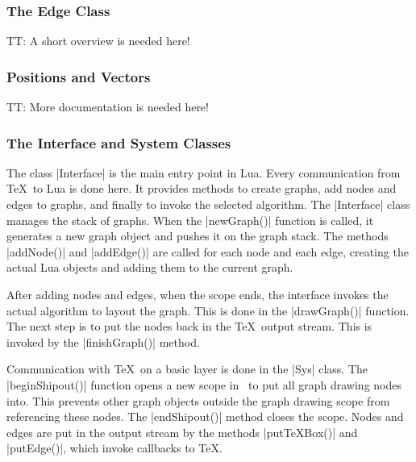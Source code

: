 



\subsubsection{The Edge Class}

TT: A short overview is needed here!




\subsubsection{Positions and Vectors}

TT: More documentation is needed here!





\subsubsection{The Interface and System Classes}

The class |Interface| is the main entry point in Lua. Every
communication from \TeX\ to Lua is done here. It provides methods to
create graphs, add nodes and edges to graphs, and finally to invoke the
selected algorithm. The |Interface| class manages the stack of
graphs. When the |newGraph()| function is called, it generates a new graph
object and pushes it on the graph stack. The methods |addNode()| and
|addEdge()| are called for each node and each edge, creating the
actual Lua objects and adding them to the current graph. 

After adding nodes and edges, when the scope ends, the interface
invokes the actual algorithm to layout the graph. This is done in the
|drawGraph()| function. The next step is to put the nodes back in the
\TeX\ output stream. This is invoked by the |finishGraph()| method. 



Communication with \TeX\ on a basic layer is done in the |Sys|
class. The |beginShipout()| function opens a new scope in \pgfname\
to put all graph drawing nodes into. This prevents other graph objects
outside the graph drawing scope from referencing these nodes. The
|endShipout()| method closes the scope. Nodes and edges are put in the
output stream by the methods |putTeXBox()| and |putEdge()|, which
invoke callbacks to \TeX. 


